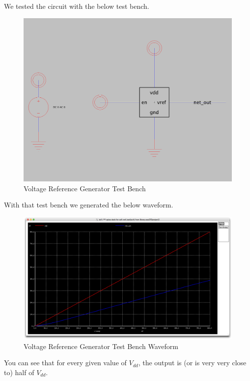 \documentclass[a4paper]{article}
\begin{document}
We tested the circuit with the below test bench.\\

\begin{figure}[H]
	\centering
	\includegraphics[scale=0.12]{vRefTest}
	\caption{Voltage Reference Generator Test Bench}
	\label{fig:vRefTest}
\end{figure}

With that test bench we generated the below waveform.\\

\begin{figure}[H]
	\centering
	\includegraphics[scale=0.1]{vRefTestWave}
	\caption{Voltage Reference Generator Test Bench Waveform}
	\label{fig:vRefTestWave}
\end{figure}

You can see that for every given value of $V_{dd}$, the output is (or is very very close to) half of $V_{dd}$.
\end{document}
